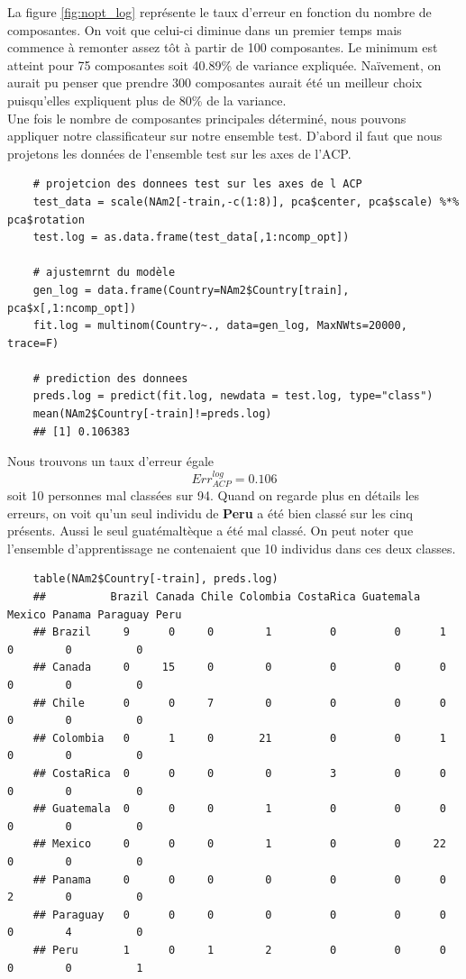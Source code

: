 \documentclass[12pt,a4paper]{article}
\begin{document}
La figure \ref{fig:nopt_log} représente le taux d'erreur en fonction du nombre de composantes. On voit que celui-ci diminue dans un premier temps mais commence à remonter assez tôt à partir de 100 composantes. Le minimum est atteint pour 75 composantes soit 40.89\% de variance expliquée. Naïvement, on aurait pu penser que prendre 300 composantes aurait été un meilleur choix puisqu'elles expliquent plus de 80\% de la variance.\vspace{3mm}\\
Une fois le nombre de composantes principales déterminé, nous pouvons appliquer notre classificateur sur notre ensemble test. D'abord il faut que nous projetons les données de l'ensemble test sur les axes de l'ACP.
\begin{lstlisting}
	# projetcion des donnees test sur les axes de l ACP
	test_data = scale(NAm2[-train,-c(1:8)], pca$center, pca$scale) %*% pca$rotation
	test.log = as.data.frame(test_data[,1:ncomp_opt])
	
	# ajustemrnt du modèle
	gen_log = data.frame(Country=NAm2$Country[train], pca$x[,1:ncomp_opt])
	fit.log = multinom(Country~., data=gen_log, MaxNWts=20000, trace=F)
	
	# prediction des donnees
	preds.log = predict(fit.log, newdata = test.log, type="class")
	mean(NAm2$Country[-train]!=preds.log)
	## [1] 0.106383
\end{lstlisting}
Nous trouvons un taux d'erreur égale\vspace{-5mm} \[Err_{ACP}^{log} = 0.106\] soit 10 personnes mal classées sur 94. Quand on regarde plus en détails les erreurs, on voit qu'un seul individu de \textbf{Peru} a été bien classé sur les cinq présents. Aussi le seul guatémaltèque a été mal classé. On peut noter que l'ensemble d'apprentissage ne contenaient que 10 individus dans ces deux classes.\vspace{2mm}
\begin{lstlisting}
	table(NAm2$Country[-train], preds.log)
	## 			Brazil Canada Chile Colombia CostaRica Guatemala Mexico Panama Paraguay Peru
	## Brazil     9      0     0        1         0         0      1      0        0          0
	## Canada     0     15     0        0         0         0      0      0        0          0
	## Chile      0      0     7        0         0         0      0      0        0          0
	## Colombia   0      1     0       21         0         0      1      0        0          0
	## CostaRica  0      0     0        0         3         0      0      0        0          0
	## Guatemala  0      0     0        1         0         0      0      0        0          0
	## Mexico     0      0     0        1         0         0     22      0        0          0
	## Panama     0      0     0        0         0         0      0      2        0          0
	## Paraguay   0      0     0        0         0         0      0      0        4          0
	## Peru       1      0     1        2         0         0      0      0        0          1
\end{lstlisting}
\end{document}
